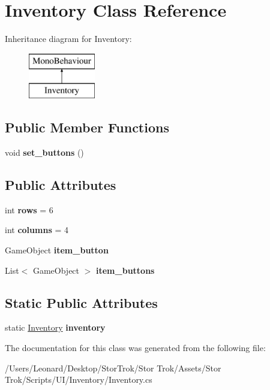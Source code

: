 \hypertarget{class_inventory}{}\section{Inventory Class Reference}
\label{class_inventory}
Inheritance diagram for Inventory\+:\begin{figure}[H]
\begin{center}
\leavevmode
\includegraphics[height=2.000000cm]{class_inventory}
\end{center}
\end{figure}
\subsection*{Public Member Functions}
\begin{DoxyCompactItemize}
\item 
\mbox{\label{class_inventory_afbb4b8ba992ef57b5760e661a67b3a44}} 
void {\bfseries set\+\_\+buttons} ()
\end{DoxyCompactItemize}
\subsection*{Public Attributes}
\begin{DoxyCompactItemize}
\item 
\mbox{\label{class_inventory_a21c56ad3fd9f538ef95afd49e5a5872d}} 
int {\bfseries rows} = 6
\item 
\mbox{\label{class_inventory_ae2c651436e459d9eb1965af0f3dfedaa}} 
int {\bfseries columns} = 4
\item 
\mbox{\label{class_inventory_a48805ee96166b00a3ba16885f07064c6}} 
Game\+Object {\bfseries item\+\_\+button}
\item 
\mbox{\label{class_inventory_a54ca888fe8cda256797d7c0522291880}} 
List$<$ Game\+Object $>$ {\bfseries item\+\_\+buttons}
\end{DoxyCompactItemize}
\subsection*{Static Public Attributes}
\begin{DoxyCompactItemize}
\item 
\mbox{\label{class_inventory_a8d51956ba6315eed2c72528ef9b806b6}} 
static \hyperlink{class_inventory}{Inventory} {\bfseries inventory}
\end{DoxyCompactItemize}


The documentation for this class was generated from the following file\+:\begin{DoxyCompactItemize}
\item 
/\+Users/\+Leonard/\+Desktop/\+Stor\+Trok/\+Stor Trok/\+Assets/\+Stor Trok/\+Scripts/\+U\+I/\+Inventory/Inventory.\+cs\end{DoxyCompactItemize}
